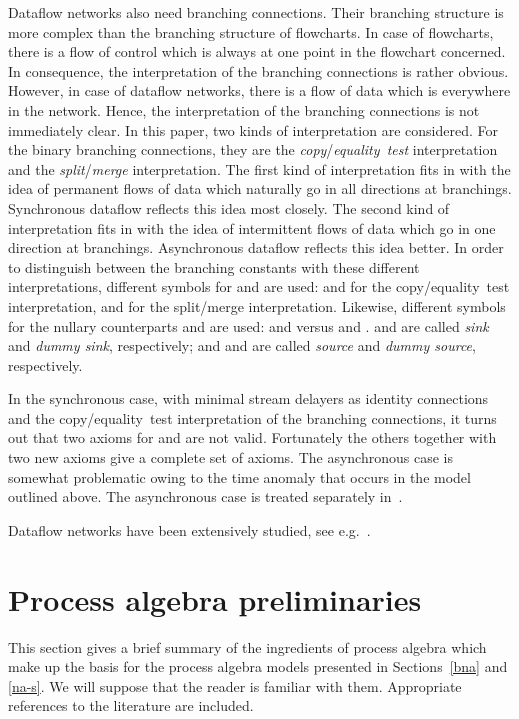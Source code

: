 \documentclass[fleqn]{llncs}
\begin{document}
Dataflow networks also need branching connections.
Their branching structure is more complex than the branching structure
of flowcharts.
In case of flowcharts, there is a flow of control which is always at
one point in the flowchart concerned.
In consequence, the interpretation of the branching connections is
rather obvious.
However, in case of dataflow networks, there is a flow of data which is
everywhere in the network.
Hence, the interpretation of the branching connections is not
immediately clear.
In this paper, two kinds of interpretation are considered.
For the binary branching connections, they are the
{\em copy}/{\em equality~test\/} interpretation and the
{\em split}/{\em merge\/} interpretation.
The first kind of interpretation fits in with the idea of permanent
flows of data which naturally go in all directions at branchings.
Synchronous dataflow reflects this idea most closely.
The second kind of interpretation fits in with the idea of intermittent
flows of data which go in one direction at branchings.
Asynchronous dataflow reflects this idea better.
In order to distinguish between the branching constants with these
different interpretations, different symbols for  and
 are used:  and  for the copy/equality~test
interpretation,  and  for the split/merge
interpretation.
Likewise, different symbols for the nullary counterparts  and
 are used:  and  versus  and
.
 and  are called {\em sink\/} and
{\em dummy sink}, respectively; and  and  are
called {\em source} and {\em dummy source}, respectively.


In the synchronous case, with minimal stream delayers as identity
connections and the copy/equality~test interpretation of the branching
connections, it turns out that two axioms for  and 
 are not valid.
Fortunately the others together with two new axioms give a complete set 
of axioms.
The asynchronous case is somewhat problematic owing to the time anomaly
that occurs in the model outlined above.
The asynchronous case is treated separately in~\cite{BMS97a}.

Dataflow networks have been extensively studied, see
e.g.~\cite{BWM94,Boh84,BA81,Bro88,Jon89,Kah74,Kok87,Rus89}.

\section{Process algebra preliminaries}
\label{preliminaries}
This section gives a brief summary of the ingredients of process
algebra which make up the basis for the process algebra models
presented in Sections~\ref{bna} and \ref{na-s}.
We will suppose that the reader is familiar with them.
Appropriate references to the literature are included.
\end{document}
